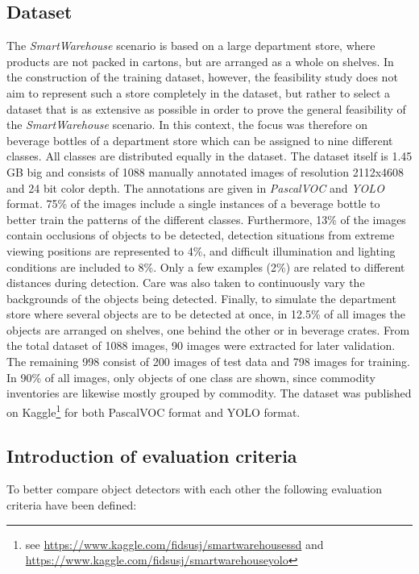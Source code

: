 \documentclass[a4paper, 10pt, journal]{wissarbIEEE}      %
\begin{document}
\subsection{Dataset}

The \textit{SmartWarehouse} scenario is based on a large department store, where products are not packed in cartons, but are arranged as a whole on shelves. In the construction of the training dataset, however, the feasibility study does not aim to represent such a store completely in the dataset, but rather to select a dataset that is as extensive as possible in order to prove the general feasibility of the \textit{SmartWarehouse} scenario. In this context, the focus was therefore on beverage bottles of a department store which can be assigned to nine different classes. All classes are distributed equally in the dataset. The dataset itself is 1.45 GB big and consists of 1088 manually annotated images of resolution 2112x4608 and 24 bit color depth. The annotations are given in \textit{PascalVOC} and \textit{YOLO} format. 75\% of the images include a single instances of a beverage bottle to better train the patterns of the different classes. Furthermore, 13\% of the images contain occlusions of objects to be detected, detection situations from extreme viewing positions are represented to 4\%, and difficult illumination and lighting conditions are included to 8\%. Only a few examples (2\%) are related to different distances during detection. Care was also taken to continuously vary the backgrounds of the objects being detected. Finally, to simulate the department store where several objects are to be detected at once, in 12.5\% of all images the objects are arranged on shelves, one behind the other or in beverage crates. From the total dataset of 1088 images, 90 images were extracted for later validation. The remaining 998 consist of 200 images of test data and 798 images for training. In 90\% of all images, only objects of one class are shown, since commodity inventories are likewise mostly grouped by commodity. The dataset was published on Kaggle\footnote{see \url{https://www.kaggle.com/fidsusj/smartwarehousessd} and \url{https://www.kaggle.com/fidsusj/smartwarehouseyolo}} for both PascalVOC format and YOLO format.

\subsection{Introduction of evaluation criteria}

To better compare object detectors with each other the following evaluation criteria have been defined:
\end{document}
